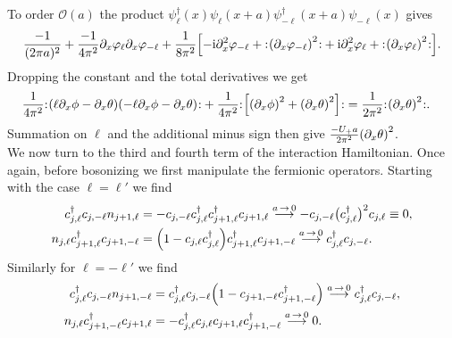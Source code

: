 \documentclass[english, parskip=full]{scrartcl}
\begin{document}
To order $\mathcal{O}(a)$ the product $\psi_\ell^\dagger(x) \psi_\ell(x+a) \psi_{-\ell}^\dagger(x+a) \psi_{-\ell}(x)$ gives
\begin{align}
\frac{-1}{(2\pi a)^2} + \frac{-1}{4\pi^2} \partial_x\varphi_\ell \partial_x\varphi_{-\ell} + \frac{1}{8\pi^2} \klb*{-\i\partial_x^2\varphi_{-\ell} + \normord{\kla*{\partial_x\varphi_{-\ell}}^2} + \i\partial_x^2\varphi_\ell + \normord{\kla*{\partial_x\varphi_\ell}^2}}.
\end{align}
Dropping the constant and the total derivatives we get
\begin{align}
\frac{1}{4\pi^2} &\normord{\kla*{\ell \partial_x\phi - \partial_x\theta} \kla*{-\ell \partial_x\phi - \partial_x\theta}} + \frac{1}{4\pi^2} \normord{\klb*{\kla*{\partial_x\phi}^2 + \kla*{\partial_x\theta}^2 }} = \frac{1}{2\pi^2} \normord{\kla*{\partial_x\theta}^2}.
\end{align}
Summation on $\ell$ and the additional minus sign then give $\frac{-U_+a}{2\pi^2} \kla*{\partial_x\theta}^2$.
\\
We now turn to the third and fourth term of the interaction Hamiltonian.
Once again, before bosonizing we first manipulate the fermionic operators.
Starting with the case $\ell=\ell'$ we find
\begin{align}
c_{j,\ell}^\dagger c_{j,-\ell} n_{j+1,\ell} &= -c_{j,-\ell} c_{j,\ell}^\dagger c_{j+1,\ell}^\dagger c_{j+1,\ell} \overset{a\,\rightarrow \, 0}{\longrightarrow} -c_{j,-\ell} \kla[\big]{c_{j,\ell}^\dagger}^2 c_{j,\ell} \equiv 0,\\
n_{j,\ell} c_{j+1,\ell}^\dagger c_{j+1,-\ell} &= \kla*{1 - c_{j,\ell} c_{j,\ell}^\dagger} c_{j+1,\ell}^\dagger c_{j+1,-\ell} \overset{a\,\rightarrow \, 0}{\longrightarrow} c_{j,\ell}^\dagger c_{j,-\ell}.
\end{align}
Similarly for $\ell = -\ell'$ we find
\begin{align}
c_{j,\ell}^\dagger c_{j,-\ell} n_{j+1,-\ell} &= c_{j,\ell}^\dagger c_{j,-\ell} \kla*{1 - c_{j+1,-\ell} c_{j+1,-\ell}^\dagger} \overset{a\,\rightarrow \, 0}{\longrightarrow} c_{j,\ell}^\dagger c_{j,-\ell},\\
n_{j,\ell} c_{j+1,-\ell}^\dagger c_{j+1,\ell} &= -c_{j,\ell}^\dagger c_{j,\ell} c_{j+1,\ell} c_{j+1,-\ell}^\dagger \overset{a\,\rightarrow \, 0}{\longrightarrow} 0.
\end{align}
\end{document}
